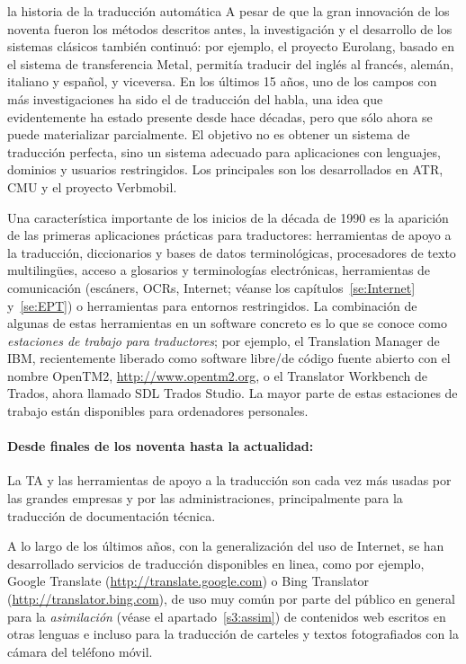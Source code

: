\begin{persabermes}{la historia de la traducción automática}
A pesar de que la gran innovación de los noventa fueron los métodos descritos antes, la investigación y el desarrollo de los sistemas clásicos también continuó: por ejemplo, el proyecto Eurolang, basado en el sistema de transferencia Metal, permitía traducir del inglés al francés, alemán, italiano y español, y viceversa. En los últimos 15 años, uno de los campos con más investigaciones ha sido el de traducción del habla, una idea que evidentemente ha estado presente desde hace décadas, pero que sólo ahora se puede materializar parcialmente. El objetivo no es obtener un sistema de traducción perfecta, sino un sistema adecuado para aplicaciones con lenguajes, dominios y usuarios restringidos. Los principales son los desarrollados en ATR, CMU y el proyecto Verbmobil. 

Una característica importante de los inicios de la década de 1990 es la aparición de las primeras aplicaciones prácticas para traductores: herramientas de apoyo a la traducción, diccionarios y bases de datos terminológicas, procesadores de texto multilingües, acceso a glosarios y terminologías electrónicas, herramientas de comunicación (escáners, OCRs, Internet; véanse los capítulos~\ref{se:Internet} y~\ref{se:EPT}) o herramientas para entornos restringidos. La combinación de algunas de estas herramientas en un software concreto es lo que se conoce como \emph{estaciones de trabajo para traductores}; por ejemplo, el Translation Manager de IBM, recientemente liberado como software libre/de código fuente abierto con el nombre OpenTM2, \url{http://www.opentm2.org}, o el Translator Workbench de Trados, ahora llamado SDL Trados Studio. La mayor parte de estas estaciones de trabajo están disponibles para ordenadores personales. 

\paragraph{Desde finales de los noventa hasta la actualidad:} La TA y las herramientas de apoyo a la traducción son cada vez más usadas por las grandes empresas y por las administraciones, principalmente para la traducción de documentación técnica. 

A lo largo de los últimos años, con la generalización del uso de Internet, se han desarrollado servicios de traducción disponibles en linea, como por ejemplo, Google Translate (\url{http://translate.google.com}) o Bing Translator (\url{http://translator.bing.com}), de uso muy común por parte del público en general para la \emph{asimilación} (véase el apartado~\ref{s3:assim}) de contenidos web escritos en otras lenguas e incluso para la traducción de carteles y textos fotografiados con la cámara del teléfono móvil. 


\end{persabermes}

